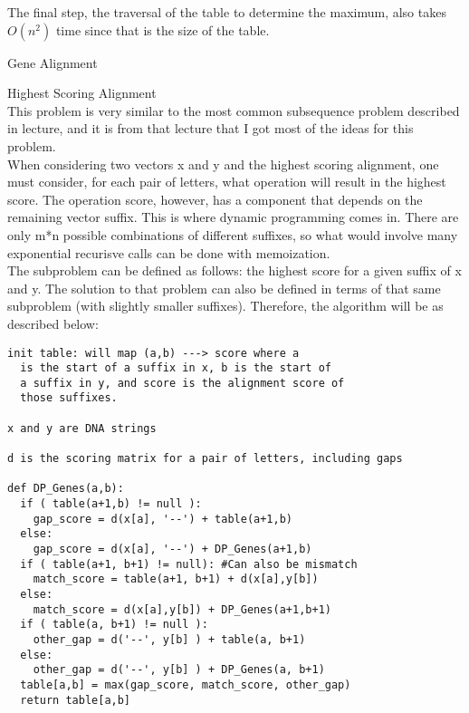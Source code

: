 \documentclass[12pt,twoside]{article}
\begin{document}
\begin{problems}
\begin{problemparts}
The final step, the traversal of the table to determine the maximum, also takes $O(n^2)$ time since that is the size of the table.\\
\end{problemparts}
\problem Gene Alignment
\begin{problemparts}
\problempart Highest Scoring Alignment\\
This problem is very similar to the most common subsequence problem described in lecture, and it is from that lecture that I got most of the ideas for this problem.\\

When considering two vectors x and y and the highest scoring alignment, one must consider, for each pair of letters, what operation will result in the highest score.  The operation score, however, has a component that depends on the remaining vector suffix.  This is where dynamic programming comes in.  There are only m*n possible combinations of different suffixes, so what would involve many exponential recurisve calls can be done with memoization.\\

The subproblem can be defined as follows: the highest score for a given suffix of x and y.  The solution to that problem can also be defined in terms of that same subproblem (with slightly smaller suffixes).  Therefore, the algorithm will be as described below:\\

\begin{lstlisting}
init table: will map (a,b) ---> score where a
  is the start of a suffix in x, b is the start of
  a suffix in y, and score is the alignment score of
  those suffixes.

x and y are DNA strings

d is the scoring matrix for a pair of letters, including gaps

def DP_Genes(a,b):
  if ( table(a+1,b) != null ):
    gap_score = d(x[a], '--') + table(a+1,b)
  else:
    gap_score = d(x[a], '--') + DP_Genes(a+1,b)
  if ( table(a+1, b+1) != null): #Can also be mismatch
    match_score = table(a+1, b+1) + d(x[a],y[b])
  else:
    match_score = d(x[a],y[b]) + DP_Genes(a+1,b+1)
  if ( table(a, b+1) != null ):
    other_gap = d('--', y[b] ) + table(a, b+1)
  else: 
    other_gap = d('--', y[b] ) + DP_Genes(a, b+1)
  table[a,b] = max(gap_score, match_score, other_gap)
  return table[a,b]
\end{lstlisting} 


\end{problemparts}
\end{problems}
\end{document}
